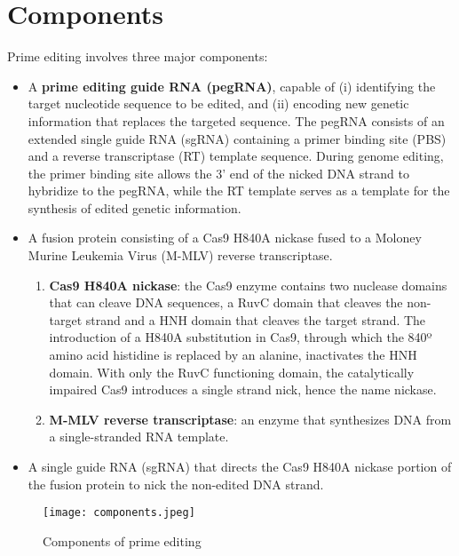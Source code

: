 \documentclass[a4paper,12pt]{extarticle}
\begin{document}
\section{Components}

Prime editing involves three major components:\\

\begin{itemize}

\item A \textbf{prime editing guide RNA (pegRNA)}, capable of (i) identifying the target nucleotide sequence to be edited, and (ii) encoding new genetic information that replaces the targeted sequence. The pegRNA consists of an extended single guide RNA (sgRNA) containing a primer binding site (PBS) and a reverse transcriptase (RT) template sequence. During genome editing, the primer binding site allows the 3’ end of the nicked DNA strand to hybridize to the pegRNA, while the RT template serves as a template for the synthesis of edited genetic information.

\item A fusion protein consisting of a Cas9 H840A nickase fused to a Moloney Murine Leukemia Virus (M-MLV) reverse transcriptase.

\begin{enumerate}

\item \textbf{Cas9 H840A nickase}: the Cas9 enzyme contains two nuclease domains that can cleave DNA sequences, a RuvC domain that cleaves the non-target strand and a HNH domain that cleaves the target strand. The introduction of a H840A substitution in Cas9, through which the 840º amino acid histidine is replaced by an alanine, inactivates the HNH domain. With only the RuvC functioning domain, the catalytically impaired Cas9 introduces a single strand nick, hence the name nickase.

\item \textbf{M-MLV reverse transcriptase}: an enzyme that synthesizes DNA from a single-stranded RNA template.

\end{enumerate}

\item A single guide RNA (sgRNA) that directs the Cas9 H840A nickase portion of the fusion protein to nick the non-edited DNA strand.

\end{itemize}

\begin{figure}[h]
\texttt{[image: components.jpeg]}
\centering
\caption{Components of prime editing}
\centering
\end{figure}
\end{document}

